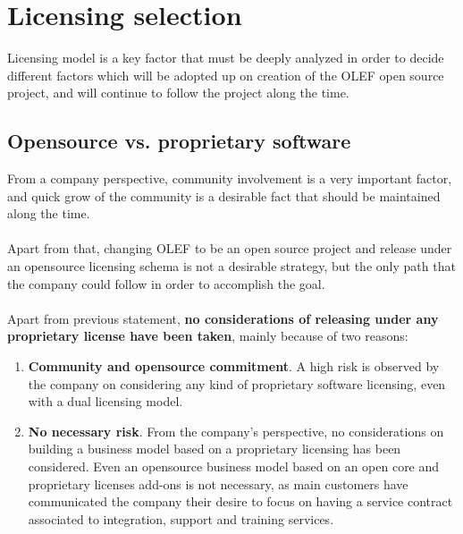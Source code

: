 \documentclass[11pt]{article}
\begin{document}
\pagebreak

\section{Licensing selection}
Licensing model is a key factor that must be deeply analyzed in order to decide different factors which will be adopted up on creation of the OLEF open source project, and will continue to follow the project along the time.
\subsection{Opensource vs. proprietary software}
From a company perspective, community involvement is a very important factor, and quick grow of the community is a desirable fact that should be maintained along the time.\\
\\
Apart from that, changing OLEF to be an open source project and release under an opensource licensing schema is not a desirable strategy, but the only path that the company could follow in order to accomplish the goal.\\
\\Apart from previous statement, \textbf{no considerations of releasing under any proprietary license have been taken}, mainly because of two reasons:
\begin{enumerate}\itemsep0pt
\item{\textbf{Community and opensource commitment}}. A high risk is observed by the company on considering any kind of proprietary software licensing, even with a dual licensing model. 
\item{\textbf{No necessary risk}}. From the company's perspective, no considerations on building a business model based on a proprietary licensing has been considered. Even an opensource business model based on an open core and proprietary licenses add-ons is not necessary, as main customers have communicated the company their desire to focus on having a service contract associated to integration, support and training services.
\end{enumerate}
\end{document}
